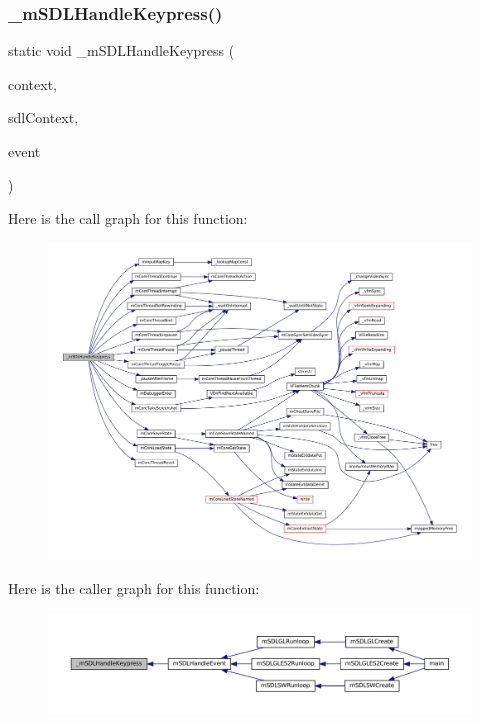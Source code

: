 \subsubsection{\texorpdfstring{\+\_\+m\+S\+D\+L\+Handle\+Keypress()}{\_mSDLHandleKeypress()}}
{\footnotesize\ttfamily static void \+\_\+m\+S\+D\+L\+Handle\+Keypress (\begin{DoxyParamCaption}\item[{struct m\+Core\+Thread $\ast$}]{context,  }\item[{struct \mbox{\hyperlink{sdl-events_8h_structm_s_d_l_player}{m\+S\+D\+L\+Player}} $\ast$}]{sdl\+Context,  }\item[{const struct S\+D\+L\+\_\+\+Keyboard\+Event $\ast$}]{event }\end{DoxyParamCaption})\hspace{0.3cm}{\ttfamily [static]}}

Here is the call graph for this function\+:
\nopagebreak
\begin{figure}[H]
\begin{center}
\leavevmode
\includegraphics[width=350pt]{sdl-events_8c_aa2c971f6d7cf960e3add9bd2252c8da5_cgraph}
\end{center}
\end{figure}
Here is the caller graph for this function\+:
\nopagebreak
\begin{figure}[H]
\begin{center}
\leavevmode
\includegraphics[width=350pt]{sdl-events_8c_aa2c971f6d7cf960e3add9bd2252c8da5_icgraph}
\end{center}
\end{figure}
\mbox{\label{sdl-events_8c_a3fc73cbd19f6b72781cd8d546ad22b64}} 
